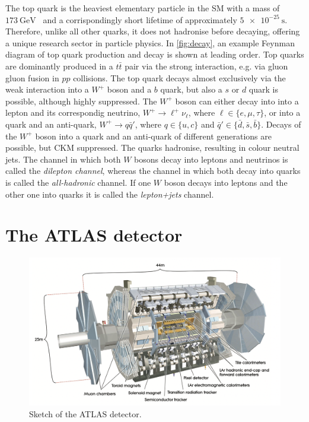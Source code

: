 The top quark is the heaviest elementary particle in the SM with a mass of $\SI{173}{\giga\eV}$~\cite{pdg} and a corrispondingly short lifetime of approximately $\SI{5e-25}{\s}$. Therefore, unlike all other quarks, it does not hadronise before decaying, offering a unique research sector in particle physics.
In \autoref{fig:decay}, an example Feynman diagram of top quark production and decay is shown at leading order.
Top quarks are dominantly produced in a $t\bar{t}$ pair via the strong interaction, e.g. via gluon gluon fusion in $pp$ collisions. The top quark decays almost exclusively via the weak interaction into a $W^+$ boson and a $b$ quark, but also a $s$ or $d$ quark is possible, although highly suppressed.
The $W^+$ boson can either decay into into a lepton and its correspondig neutrino, $W^+ \to \ell^+ \nu_\ell$, where $\ell \in \{e, \mu, \tau\}$, or into a quark and an anti-quark, $W^+ \to q\bar{q}\prime$, where $q \in \{u, c\}$ and $\bar{q}\prime \in \{\bar{d}, \bar{s}, \bar{b}\}$.
Decays of the $W^+$ boson into a quark and an anti-quark of different generations are possible, but CKM suppressed.
The quarks hadronise, resulting in colour neutral jets. The channel in which both $W$ bosons decay into leptons and neutrinos is called the \textit{dilepton channel}, whereas the channel in which both decay into quarks is called the \textit{all-hadronic} channel. If one $W$ boson decays into leptons and the other one into quarks it is called the \textit{lepton+jets} channel.

\section{The ATLAS detector}

\begin{figure}[tb]
  \centering
  \includegraphics[width=.8\textwidth]{graphics/detector.png}
  \caption{Sketch of the ATLAS detector. \cite{ATLAS}}
  \label{fig:detector}
\end{figure}

